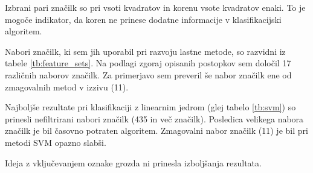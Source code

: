 \documentclass[11pt,a4paper,openany]{book}
\begin{document}
\noindent Izbrani pari značilk so pri vsoti kvadratov in korenu vsote kvadratov enaki. To je mogoče indikator, da koren ne prinese dodatne informacije v klasifikacijski algoritem.

Nabori značilk, ki sem jih uporabil pri razvoju lastne metode, so razvidni iz tabele \ref{tb:feature_sets}. Na podlagi zgoraj opisanih postopkov sem določil 17 različnih naborov značilk. Za primerjavo sem preveril še nabor značilk ene od zmagovalnih metod v izzivu (11).

Najboljše rezultate pri klasifikaciji z linearnim jedrom (glej tabelo \ref{tb:svm}) so prinesli nefiltrirani nabori značilk (435 in več značilk). Posledica velikega nabora značilk je bil časovno potraten algoritem. Zmagovalni nabor značilk (11) je bil pri metodi SVM opazno slabši. 

Ideja z vključevanjem oznake grozda ni prinesla izboljšanja rezultata. 
\end{document}
